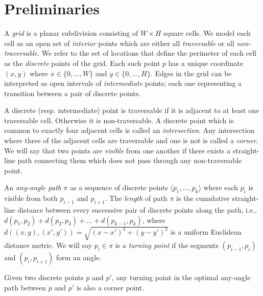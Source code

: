 \section{Preliminaries}
A \emph{grid} is a planar subdivision consisting of $W \times H$ square cells.
We model each cell as an open set of \emph{interior} points which are 
either all \emph{traversable} or all \emph{non-traversable}.
We refer to the set of locations that define the perimeter of each cell as the 
\emph{discrete} points of the grid. Each such point $p$ has a unique coordinate $(x, y)$
where $x \in \{0,\dots,W\}$ and $y \in \{0,\dots,H\}$.
Edges in the grid can be interpreted as open intervals of \emph{intermediate}
points; each one representing a transition between a pair of discrete points. 
\par
A discrete (resp. intermediate) point is traversable if it is adjacent to 
at least one traversable cell. Otherwise it is non-traversable.
A discrete point which is common to exactly four adjacent cells is called an \emph{intersection}.
Any intersection where three of the adjacent cells are traversable and one is not
is called a \emph{corner}.
We will say that two points are \emph{visible} from one another if there exists a 
straight-line path connecting them which does not pass through any non-traversable point.

An \emph{any-angle path} $\pi$ as a sequence of discrete points 
$\langle p_1,\dots,p_k \rangle$ where each $p_{i}$ is visible from both $p_{i-1}$
and $p_{i+1}$.
The \emph{length} of path $\pi$ 
is the cumulative straight-line distance between every successive
pair of discrete points along the path, 
i.e., $d(p_1,p_2) + d(p_2,p_3) + \dots + d(p_{k-1},p_k)$, 
where $d((x,y), (x',y'))= \sqrt{(x-x')^2 + (y-y')^2}$ 
is a uniform Euclidean distance metric.
We will say $p_i \in \pi$ is a \emph{turning point} if the segments
$(p_{i-1}, p_i)$ and $(p_i, p_{i+1})$ form an angle.
\\
\begin{lemm}
\label{lemma::corner}
  Given two discrete points $p$ and $p'$, 
  any turning point in the optimal any-angle path between $p$ and $p'$ 
  is also a corner point.
\end{lemm}


